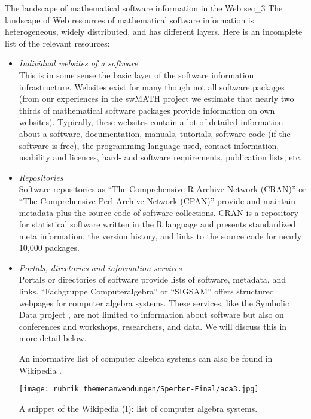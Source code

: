 \documentclass[a4paper,11pt]{article}
\begin{document}
\begin{multicols}{2}
\Ueberschrift
{The landscape of mathematical software information in the Web}
{sec_3}
The landscape of Web resources of mathematical software information is heterogeneous, widely distributed, and has different layers.  Here is an incomplete list of the relevant resources:
\begin{itemize}
\item{\textit{Individual websites of a software}}\\
This is in some sense the basic layer of the software information infrastructure. Websites exist for many though not all software
  packages (from our experiences in the swMATH project we estimate that nearly two thirds of mathematical software packages provide information on own websites). Typically, these websites contain a lot of detailed information about a software, documentation, manuals, tutorials, software code (if the software is free), the programming language used, contact information, usability and licences, hard- and software requirements, publication lists, etc.
\item{\textit{Repositories}}\\
Software repositories as ``The Comprehensive R Archive Network (CRAN)'' \cite{CRAN} or ``The Comprehensive Perl Archive Network (CPAN)'' \cite{CPAN} provide and maintain  metadata plus the source code of software collections. CRAN is a repository for statistical software written in the R language and presents standardized meta information, the version history,  and links to the source code for nearly 10,000 packages.
\item{\textit{Portals, directories and information services}}\\
Portals or directories of software provide lists of software, metadata, and links. ``Fachgruppe Computeralgebra'' \cite{FAG} or ``SIGSAM'' \cite{SIGSAM} offers structured webpages for computer
algebra systems. These services, like the Symbolic Data project \cite{SD}, are not limited to information about software but also on conferences and workshops, researchers, and data. We will discuss this in more detail below.

An informative list of computer algebra systems can also be found in  Wikipedia \cite{WikipediaCAS}.

\begin{figurehere}
  \centering
  \texttt{[image: rubrik\_themenanwendungen/Sperber-Final/aca3.jpg]}
  \caption{A snippet of the Wikipedia (I): list of  computer algebra systems.\label{abb_3}}
\end{figurehere}


\end{itemize}
\end{multicols}
\end{document}
